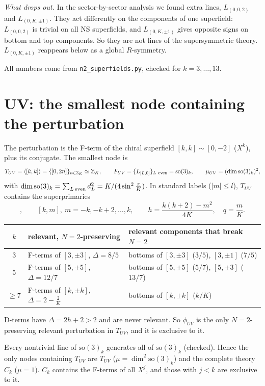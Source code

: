 \documentclass[11pt]{article}
\newcommand{\so}{\mathrm{so}(3)_k}
\newcommand{\Z}{\mathbb{Z}}
\begin{document}
\emph{What drops out.} In the sector-by-sector analysis we found extra lines, $L_{(0,0,2)}$ and $L_{(0,K,\pm1)}$. They act differently on the components of one superfield: $L_{(0,0,2)}$ is trivial on all NS superfields, and $L_{(0,K,\pm1)}$ gives opposite signs on bottom and top components. So they are not lines of the supersymmetric theory. $L_{(0,K,\pm1)}$ reappears below as a global $R$-symmetry.

All numbers come from \texttt{n2\_superfields.py}, checked for $k=3,\dots,13$.

\section{UV: the smallest node containing the perturbation}

The perturbation is the F-term of the chiral superfield $[k,k]\sim[0,-2]$ ($X^k$), plus its conjugate. The smallest node is
\begin{equation}
T_{UV}=\langle[k,k]\rangle=\{[0,2n]\}_{n\in\Z_K}\simeq\Z_K,\qquad F_{UV}=\{L_{[L,0]}\}_{L\ \rm even}=\so,\qquad \mu_{UV}=(\dim\so)^2,
\end{equation}
with $\dim\so=\sum_{L\,\rm even}d_L^2=K/(4\sin^2\frac\pi K)$. In standard labels ($|m|\le l$), $T_{UV}$ contains the superprimaries
\begin{equation}
[0,0],\qquad [k,m],\ m=-k,-k+2,\dots,k,\qquad h=\frac{k(k+2)-m^2}{4K},\quad q=\frac mK .
\end{equation}

\begin{center}\small
\begin{tabular}{cll}
\toprule
$k$ & relevant, $N=2$-preserving & relevant components that break $N=2$\\
\midrule
3 & F-terms of $[3,\pm3]$, $\Delta=8/5$ & bottoms of $[3,\pm3]$ ($3/5$), $[3,\pm1]$ ($7/5$)\\
5 & F-terms of $[5,\pm5]$, $\Delta=12/7$ & bottoms of $[5,\pm5]$ ($5/7$), $[5,\pm3]$ ($13/7$)\\
$\ge7$ & F-terms of $[k,\pm k]$, $\Delta=2-\frac2K$ & bottoms of $[k,\pm k]$ ($k/K$)\\
\bottomrule
\end{tabular}
\end{center}

\noindent D-terms have $\Delta=2h+2>2$ and are never relevant. So $\phi_{UV}$ is the only $N=2$-preserving relevant perturbation in $T_{UV}$, and it is exclusive to it.

Every nontrivial line of $\so$ generates all of $\so$ (checked). Hence the only nodes containing $T_{UV}$ are $T_{UV}$ ($\mu=\dim^2\so$) and the complete theory $C_k$ ($\mu=1$). $C_k$ contains the F-terms of all $X^j$, and those with $j<k$ are exclusive to it.
\end{document}
